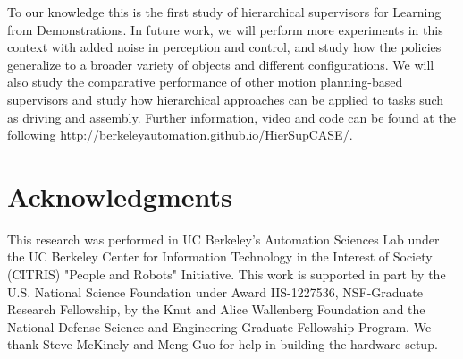 \documentclass[10pt, conference]{ieeeconf}      %
\begin{document}
To our knowledge this is the first study of hierarchical supervisors for Learning from Demonstrations. In future work, we will perform more experiments in this context with added noise in perception and control, and study how the policies generalize to a broader variety of objects and different configurations. We will also study the comparative performance of other motion planning-based supervisors and study how hierarchical approaches can be applied to tasks such as driving and assembly.  Further information, video and code can be found at the following \url{http://berkeleyautomation.github.io/HierSupCASE/}. 




 \section{Acknowledgments} 
This research was performed in UC Berkeley's Automation Sciences Lab under the UC Berkeley Center for Information Technology in the Interest of Society (CITRIS) "People and Robots" Initiative. This work is supported in part by the U.S. National Science Foundation under Award IIS-1227536, NSF-Graduate Research Fellowship, by the Knut and Alice Wallenberg Foundation and the National Defense Science and Engineering Graduate Fellowship Program. We thank Steve McKinely and Meng Guo for help in building the hardware setup.  

  


\end{document}
